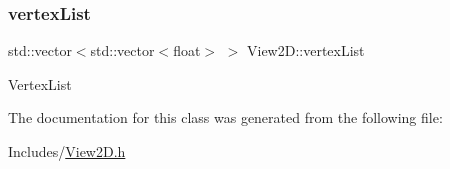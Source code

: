 \subsubsection{\texorpdfstring{vertex\+List}{vertexList}}
{\footnotesize\ttfamily std\+::vector$<$std\+::vector$<$float$>$ $>$ View2\+D\+::vertex\+List}

Vertex\+List 

The documentation for this class was generated from the following file\+:\begin{DoxyCompactItemize}
\item 
Includes/\mbox{\hyperlink{_view2_d_8h}{View2\+D.\+h}}\end{DoxyCompactItemize}
